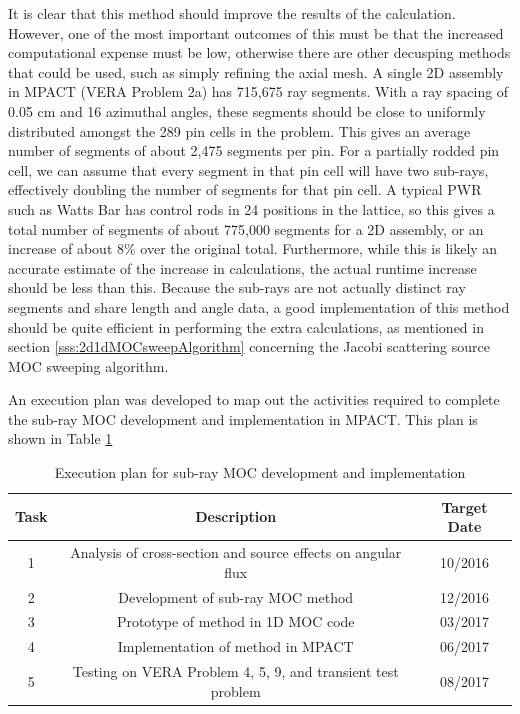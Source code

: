It is clear that this method should improve the results of the calculation.  However, one of the most important outcomes of this must be that the increased computational expense must be low, otherwise there are other decusping methods that could be used, such as simply refining the axial mesh.  A single 2D assembly in MPACT (VERA Problem 2a) has 715,675 ray segments.  With a ray spacing of 0.05 cm and 16 azimuthal angles, these segments should be close to uniformly distributed amongst the 289 pin cells in the problem.  This gives an average number of segments of about 2,475 segments per pin.  For a partially rodded pin cell, we can assume that every segment in that pin cell will have two sub-rays, effectively doubling the number of segments for that pin cell.  A typical PWR such as Watts Bar has control rods in 24 positions in the lattice, so this gives a total number of segments of about 775,000 segments for a 2D assembly, or an increase of about 8\% over the original total.  Furthermore, while this is likely an accurate estimate of the increase in calculations, the actual runtime increase should be less than this.  Because the sub-rays are not actually distinct ray segments and share length and angle data, a good implementation of this method should be quite efficient in performing the extra calculations, as mentioned in section \ref{sss:2d1dMOCsweepAlgorithm} concerning the Jacobi scattering source MOC sweeping algorithm.

An execution plan was developed to map out the activities required to complete the sub-ray MOC development and implementation in MPACT.  This plan is shown in Table \ref{t:subrayExecutionPlan}

\begin{table}[h]
  \centering
  \caption[Sub-Ray MOC Development Plan]{Execution plan for sub-ray MOC development and implementation}\label{t:subrayExecutionPlan}
  \begin{tabular}{|c|c|c|}\toprule
    Task & Description & Target Date \\\midrule
    1 & Analysis of cross-section and source effects on angular flux & 10/2016 \\\midrule
    2 & Development of sub-ray MOC method & 12/2016 \\\midrule
    3 & Prototype of method in 1D MOC code & 03/2017 \\\midrule
    4 & Implementation of method in MPACT & 06/2017 \\\midrule
    5 & Testing on VERA Problem 4, 5, 9, and transient test problem & 08/2017 \\\bottomrule
  \end{tabular}
\end{table}